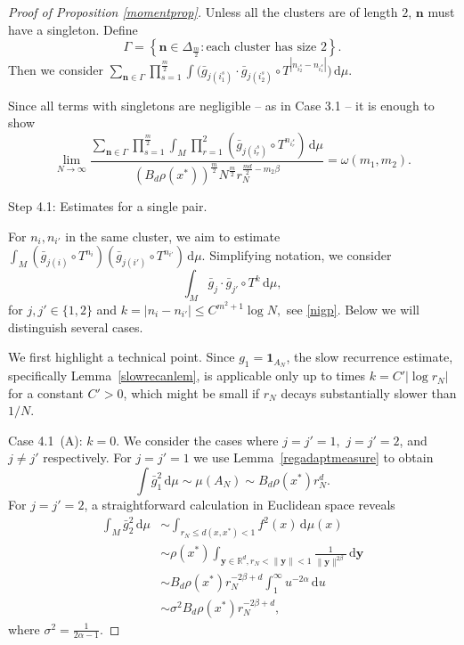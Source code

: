 \documentclass[11pt,twoside,a4paper,reqno]{amsart}
\renewcommand{\d}{\, \text{d}}
\newcommand{\R}{\mathbb{R}}
\def\one{{\mathbf{1}}}
\begin{document}
\begin{proof}[Proof of Proposition \ref{momentprop}]
Unless all the clusters are of length $2$, $\textbf{n}$ must have a singleton. Define
$$
\Gamma=\left\{\mathbf{n}\in \Delta_{\frac{m}{2}} : \text{each cluster has size } 2\right\}.
$$
Then we consider
$\sum_{\mathbf{n}\in\Gamma}\prod_{s=1}^{\frac{m}{2}}\int \big(\bar{g}_{j(i^s_1)} \cdot \bar{g}_{j(i^s_2)} \circ T^{|n_{i^s_2}-n_{i^s_1}|}\big)\d\mu.$

Since all terms with singletons are negligible -- as in Case 3.1 -- it is enough to show
\begin{equation}\label{momentgammaclaim}
\lim_{N\rightarrow \infty} \frac{\sum_{\textbf{n}\in \Gamma} \prod_{s=1}^{\frac{m}{2}} \int_M \prod_{r=1}^{2} (\bar{g}_{j(i^s_r)} \circ T^{n_{i^s_r}}) \d\mu}{\left(B_d \rho(x^*)\right)^{\frac{m}{2}} N^{\frac{m}{2}} r_N^{\frac{md}{2}-m_2\beta }} = \omega(m_1,m_2).
\end{equation}

Step 4.1: Estimates for a single pair.

For $n_i,n_{i'}$ in the same cluster, we aim to estimate $\int_M (\bar{g}_{j(i)} \circ T^{n_i})(\bar{g}_{j(i')} \circ T^{n_{i'}})\d\mu$. Simplifying notation, we consider
\begin{equation*}
\int_M \bar{g}_j \cdot \bar{g}_{j'} \circ T^k\d\mu,
\end{equation*}
for $j,j' \in \{1,2\}$ and $k=|n_i - n_{i'}| \leq C^{m^2+1} \log N,$ see \eqref{nigp}. Below we will distinguish several cases.


We first highlight a technical point. Since $g_1 = \one_{A_N}$, the slow recurrence estimate, specifically Lemma~\ref{slowrecanlem}, is applicable only up to times $k=C' |\log r_N|$ for a constant $C'>0$, which might be small if $r_N$ decays substantially slower than $1/N$.






Case 4.1~(A): $k=0$. We consider the cases where $j=j'=1,$ $j=j'=2$, and $j\neq j'$ respectively. For $j=j'=1$ we use Lemma~\ref{regadaptmeasure} to obtain
\begin{equation}\label{mainest1}
\int \bar{g}_1^2\d\mu\sim \mu(A_N)\sim B_d \rho(x^*) r_N^d.
\end{equation}
For $j=j'=2$, a straightforward calculation in Euclidean space reveals
\begin{equation}\label{mainest2}
\begin{aligned}
\int_M \bar{g}_2^2 \d\mu &\sim\int_{r_N \leq d(x,x^*) < 1} f^2(x)\d\mu(x)\\
&\sim \rho(x^*)\int_{\textbf{y}\in \R^d, r_N < \|\textbf{y}\| < 1} \frac{1}{\|\textbf{y}\|^{2\beta}} \d \textbf{y}\\
&\sim B_d \rho(x^*) r_N^{-2\beta+d} \int_1^{\infty} u^{-2\alpha} \d u \\
&\sim \sigma^2 B_d \rho(x^*) r_N^{-2\beta+d},
\end{aligned}
\end{equation}
where $\sigma^2=\frac{1}{2\alpha-1}$.



\end{proof}
\end{document}

